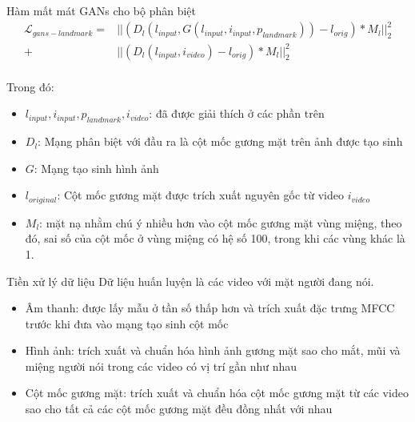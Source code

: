 \begin{frame}{Hàm mất mát GANs cho bộ phân biệt}
\begin{equation}
    \begin{split}
    \mathcal{L}_{gans-landmark} = &||(D_l(l_{input},G(l_{input},i_{input},p_{landmark})) - l_{orig})*M_l||^2_2\\
    +&||(D_l(l_{input},i_{video}) - l_{orig})*M_l||^2_2\\
    \end{split}
\end{equation}

    Trong đó:
    \begin{itemize}
        \item \textbf{$l_{input},i_{input},p_{landmark},i_{video}$}: đã được giải thích ở các phần trên
        \item \textbf{$D_l$}: Mạng phân biệt với đầu ra là cột mốc gương mặt trên ảnh được tạo sinh
        \item \textbf{$G$}: Mạng tạo sinh hình ảnh
        \item \textbf{$l_{original}$}: Cột mốc gương mặt được trích xuất nguyên gốc từ video $i_{video}$
        \item \textbf{$M_l$}: mặt nạ nhằm chú ý nhiều hơn vào cột mốc gương mặt vùng miệng, theo đó, sai số của cột mốc ở vùng miệng có hệ số 100, trong khi các vùng khác là 1.
    \end{itemize}
\end{frame}

\begin{frame}{Tiền xử lý dữ liệu}
    Dữ liệu huấn luyện là các video với mặt người đang nói.
    \begin{itemize}
        \item Âm thanh: được lấy mẫu ở tần số thấp hơn và trích xuất đặc trưng MFCC trước khi đưa vào mạng tạo sinh cột mốc
        \item Hình ảnh: trích xuất và chuẩn hóa hình ảnh gương mặt sao cho mắt, mũi và miệng người nói trong các video có vị trí gần như nhau
        \item Cột mốc gương mặt: trích xuất và chuẩn hóa cột mốc gương mặt từ các video sao cho tất cả các cột mốc gương mặt đều đồng nhất với nhau
    \end{itemize}
\end{frame}
